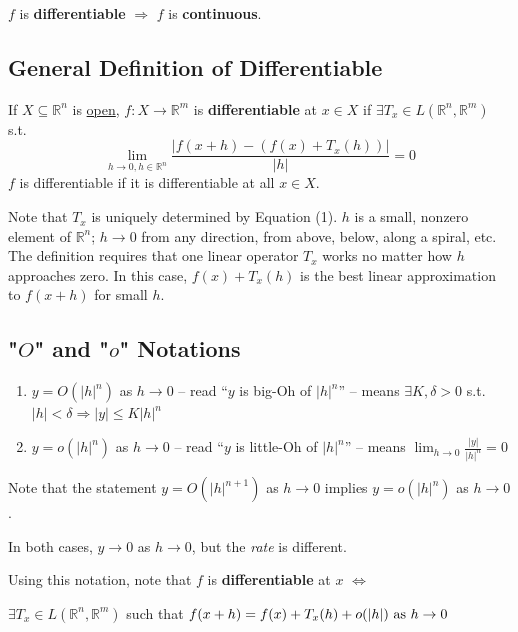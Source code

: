 \documentclass[11pt]{elegantbook}
\begin{document}
\begin{proposition}
    $f$ is \textbf{differentiable} $\Rightarrow$ $f$ is \textbf{continuous}.
\end{proposition}

\subsection{General Definition of Differentiable}
\begin{definition}
    \normalfont
    If $X \subseteq \mathbb{R}^n$ is \underline{open}, $f : X \rightarrow \mathbb{R}^m$ is \textbf{differentiable} at $x \in X$ if $\exists T_x\in L(\mathbb{R}^n,\mathbb{R}^m)$ s.t. $$\lim_{h \rightarrow 0, h\in \mathbb{R}^n}\frac{|f(x+h)-(f(x)+T_x(h))|}{|h|}=0$$
    $f$ is differentiable if it is differentiable at all $x \in X$.
\end{definition}
Note that $T_x$ is uniquely determined by Equation (1). $h$ is a small, nonzero element of $\mathbb{R}^n$; $h \rightarrow 0$ from any direction, from above, below, along a spiral, etc. The definition requires that one linear operator $T_x$ works no matter how $h$ approaches zero. In this case, $f(x) + T_x(h)$ is the best linear approximation to $f(x + h)$ for small $h$.

\subsection{"$O$" and "$o$" Notations}
\begin{definition}["$O$" and "$o$"]
    \normalfont
    \begin{enumerate}
        \item $y = O(|h|^n)$ as $h \rightarrow 0$ -- read “$y$ is big-Oh of $|h|^n$” -- means $\exists K, \delta > 0$ s.t. $|h| < \delta \Rightarrow |y| \leq K|h|^n$
        \item $y = o(|h|^n)$ as $h \rightarrow 0$ -- read “$y$ is little-Oh of $|h|^n$” -- means $\lim_{h \rightarrow 0}\frac{|y|}{|h|^n}=0$
    \end{enumerate}
\end{definition}
\begin{note}
    Note that the statement $y = O(|h|^{n+1})$ as $h \rightarrow 0$ implies $y = o(|h|^n)$ as $h \rightarrow 0$.
\end{note}
In both cases, $y \rightarrow 0$ as $h \rightarrow 0$, but the \textit{rate} is different.

\begin{definition}
    \normalfont
    Using this notation, note that $f$ is \textbf{differentiable} at $x$ $\Leftrightarrow$
    \begin{center}
        $\exists T_x\in L(\mathbb{R}^n,\mathbb{R}^m)$ such that $f(x+h)=f(x)+T_x(h)+o(|h|)\textnormal{ as }h \rightarrow 0$
    \end{center}
\end{definition}
\end{document}
